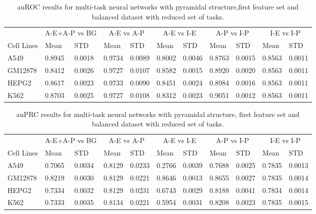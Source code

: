 \begin{table}[!htbp]
\centering
\caption{auROC results for multi-task neural networks with pyramidal structure,first feature set and balanced dataset with reduced set of tasks.}
\label{tab:4celllines_auroc}
\hspace*{-2.2cm}
\begin{tabular}[t]{*{11}{l}}
\toprule
 & \multicolumn{2}{c}{A-E+A-P vs BG} & \multicolumn{2}{c}{A-E vs A-P} & \multicolumn{2}{c}{A-E vs I-E} & \multicolumn{2}{c}{A-P vs I-P} & \multicolumn{2}{c}{I-E vs I-P} \\
\cmidrule(lr){2-3}
\cmidrule(lr){4-5}
\cmidrule(lr){6-7}
\cmidrule(lr){8-9}
\cmidrule(lr){10-11}
Cell Lines & Mean & STD & Mean & STD & Mean & STD & Mean & STD & Mean & STD \\
\midrule
A549  & 0.8945 & 0.0018 & 0.9734 & 0.0089 & 0.8002 & 0.0046 & 0.8763 & 0.0015 & 0.8563 & 0.0011\\
GM12878  & 0.8412 & 0.0026 & 0.9727 & 0.0107 & 0.8582 & 0.0015 & 0.8920 & 0.0020 & 0.8563 & 0.0011\\
HEPG2  & 0.8617 & 0.0023 & 0.9733 & 0.0090 & 0.8451 & 0.0024 & 0.8984 & 0.0016 & 0.8563 & 0.0011\\
K562  & 0.8703 & 0.0025 & 0.9727 & 0.0108 & 0.8312 & 0.0023 & 0.9051 & 0.0012 & 0.8563 & 0.0011\\
\bottomrule
\end{tabular}
\hspace*{-2.2cm}
\end{table}
\begin{table}[!htbp]
\centering
\caption{auPRC results for multi-task neural networks with pyramidal structure, first feature set and balanced dataset with reduced set of tasks.}
\label{tab:4celllines_auprc}
\hspace*{-2.2cm}
\begin{tabular}[t]{*{11}{l}}
\toprule
 & \multicolumn{2}{c}{A-E+A-P vs BG} & \multicolumn{2}{c}{A-E vs A-P} & \multicolumn{2}{c}{A-E vs I-E} & \multicolumn{2}{c}{A-P vs I-P} & \multicolumn{2}{c}{I-E vs I-P} \\
\cmidrule(lr){2-3}
\cmidrule(lr){4-5}
\cmidrule(lr){6-7}
\cmidrule(lr){8-9}
\cmidrule(lr){10-11}
Cell Lines & Mean & STD & Mean & STD & Mean & STD & Mean & STD & Mean & STD \\
\midrule
A549  & 0.7065 & 0.0034 & 0.8129 & 0.0233 & 0.2766 & 0.0039 & 0.7688 & 0.0025 & 0.7835 & 0.0013\\
GM12878  & 0.8219 & 0.0030 & 0.8129 & 0.0221 & 0.8646 & 0.0013 & 0.8655 & 0.0027 & 0.7835 & 0.0014\\
HEPG2  & 0.7334 & 0.0032 & 0.8129 & 0.0231 & 0.6743 & 0.0029 & 0.8188 & 0.0041 & 0.7834 & 0.0014\\
K562  & 0.7333 & 0.0035 & 0.8134 & 0.0221 & 0.5954 & 0.0031 & 0.8208 & 0.0023 & 0.7835 & 0.0015\\ 
\bottomrule
\end{tabular}
\hspace*{-2.2cm}
\end{table}
